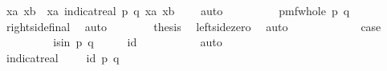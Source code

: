 \begin{isabellebody}
\ {\isachardoublequoteopen}{\isacharparenleft}{\kern0pt}{\isacharparenleft}{\kern0pt}{\isasymSum}xa{\isasymin}{\isasymK}{\isachardot}{\kern0pt}\ {\isacharparenleft}{\kern0pt}{\isasymSum}xb{\isasymin}{\isacharparenleft}{\kern0pt}{\isasymK}\ {\isacharminus}{\kern0pt}\ {\isacharbraceleft}{\kern0pt}xa{\isacharbraceright}{\kern0pt}{\isacharparenright}{\kern0pt}{\isachardot}{\kern0pt}\ {\isacharparenleft}{\kern0pt}indicat{\isacharunderscore}{\kern0pt}real\ {\isacharbraceleft}{\kern0pt}{\isacharparenleft}{\kern0pt}p{\isacharcomma}{\kern0pt}\ q{\isacharparenright}{\kern0pt}{\isacharbraceright}{\kern0pt}\ {\isacharparenleft}{\kern0pt}xa{\isacharcomma}{\kern0pt}\ xb{\isacharparenright}{\kern0pt}{\isacharparenright}{\kern0pt}{\isacharparenright}{\kern0pt}{\isacharparenright}{\kern0pt}{\isacharparenright}{\kern0pt}\ {\isacharequal}{\kern0pt}\ {}{\isachardoublequoteclose}\ \isamarkupfalse%
\ auto\isanewline
\ \ \ \ \ \ \isamarkupfalse%
\ \isamarkupfalse%
\ {\isachardoublequoteopen}{\isacharquery}{\kern0pt}pmf{\isacharunderscore}{\kern0pt}whole\ {\isacharparenleft}{\kern0pt}p{\isacharcomma}{\kern0pt}\ q{\isacharparenright}{\kern0pt}\ {\isacharequal}{\kern0pt}\ {}{\isachardoublequoteclose}\ \isamarkupfalse%
\ right{\isacharunderscore}{\kern0pt}side{\isacharunderscore}{\kern0pt}final\ \isamarkupfalse%
\ auto\isanewline
\ \ \ \ \ \ \isamarkupfalse%
\ {\isacharquery}{\kern0pt}thesis\ \isamarkupfalse%
\ left{\isacharunderscore}{\kern0pt}side{\isacharunderscore}{\kern0pt}zero\ \isamarkupfalse%
\ auto\isanewline
\ \ \ \ \isamarkupfalse%
\isanewline
\ \ \ \ \ \ \isamarkupfalse%
\ case{\isacharunderscore}{\kern0pt}{}\isanewline
\ \ \ \ \ \ \isamarkupfalse%
\ \isamarkupfalse%
\ is{\isacharunderscore}{\kern0pt}in{\isacharcolon}{\kern0pt}\ {\isachardoublequoteopen}{\isacharparenleft}{\kern0pt}p{\isacharcomma}{\kern0pt}\ q{\isacharparenright}{\kern0pt}\ {\isasymin}\ {\isasymK}\ {\isasymtimes}\ {\isasymK}\ {\isacharminus}{\kern0pt}\ {\isacharquery}{\kern0pt}id{\isachardoublequoteclose}\ \isanewline
\ \ \ \ \ \ \ \ \isamarkupfalse%
\ auto\isanewline
\ \ \ \ \ \ \isamarkupfalse%
\ \isamarkupfalse%
\ {\isachardoublequoteopen}indicat{\isacharunderscore}{\kern0pt}real\ {\isacharparenleft}{\kern0pt}{\isasymK}\ {\isasymtimes}\ {\isasymK}\ {\isacharminus}{\kern0pt}\ {\isacharquery}{\kern0pt}id{\isacharparenright}{\kern0pt}\ {\isacharparenleft}{\kern0pt}p{\isacharcomma}{\kern0pt}\ q{\isacharparenright}{\kern0pt}\ {\isacharequal}{\kern0pt}\ {}{\isachardoublequoteclose}\ \isamarkupfalse%

\end{isabellebody}
